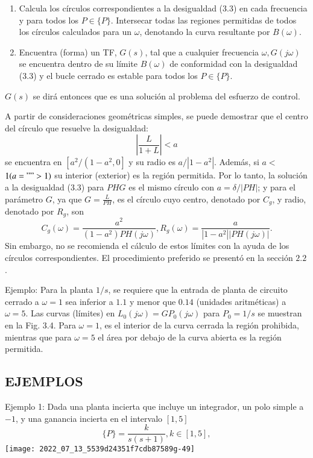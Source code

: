 \begin{enumerate}
  \item Calcula los círculos correspondientes a la desigualdad (3.3) en cada frecuencia y para todos los $P \in\{P\}$. Intersecar todas las regiones permitidas de todos los círculos calculados para un $\omega$, denotando la curva resultante por $B(\omega)$.

  \item Encuentra (forma) un TF, $G(s)$, tal que a cualquier frecuencia $\omega, G(j \omega)$ se encuentra dentro de su límite $B(\omega)$ de conformidad con la desigualdad (3.3) y el bucle cerrado es estable para todos los $P \in\{P\}$.

\end{enumerate}
$G(s)$ se dirá entonces que es una solución al problema del esfuerzo de control.

A partir de consideraciones geométricas simples, se puede demostrar que el centro del círculo que resuelve la desigualdad:
$$
\left|\frac{L}{1+L}\right|<a
$$
se encuentra en $\left[a^{2} /\left(1-a^{2}, 0\right]\right.$ y su radio es $a / \left|1-a^{2}\right|$. Además, si $a<$ $1(a="">1)$ su interior (exterior) es la región permitida. Por lo tanto, la solución a la desigualdad (3.3) para $P H G$ es el mismo círculo con $a=\delta /| P H|$; y para el parámetro $G$, ya que $G=\frac{L}{P H}$, es el círculo cuyo centro, denotado por $C_{g}$, y radio, denotado por $R_{g}$, son
$$
C_{g}(\omega)=\frac{a^{2}}{\left(1-a^{2}\right) P H(j \omega)}, R_{g}(\omega)=\frac{a}{\left|1-a^{2}\right|| P H(j \omega)|} .
$$
Sin embargo, no se recomienda el cálculo de estos límites con la ayuda de los círculos correspondientes. El procedimiento preferido se presentó en la sección $2.2$.

Ejemplo: Para la planta $1 / s$, se requiere que la entrada de planta de circuito cerrado a $\omega=1$ sea inferior a $1.1$ y menor que $0.14$ (unidades aritméticas) a $\omega=5$. Las curvas (límites) en $L_{0}(j \omega)=G P_{0}(j \omega)$ para $P_{0}=1 / s$ se muestran en la Fig. 3.4. Para $\omega=1$, es el interior de la curva cerrada la región prohibida, mientras que para $\omega=5$ el área por debajo de la curva abierta es la región permitida.

\subsection{EJEMPLOS}
Ejemplo 1: Dada una planta incierta que incluye un integrador, un polo simple a $-1$, y una ganancia incierta en el intervalo $[1,5]$
$$
\{P\}=\frac{k}{s(s+1)}, k \in[1,5],
$$
\texttt{[image: 2022\_07\_13\_5539d24351f7cdb87589g-49]}

